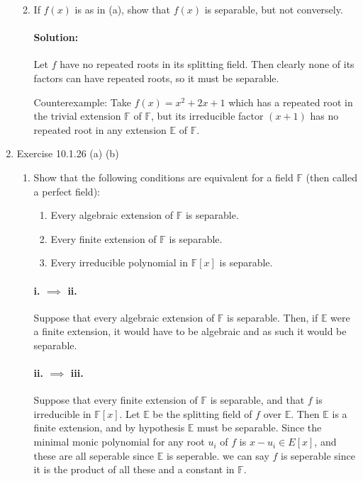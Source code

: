 \documentclass{article}
\begin{document}
\begin{enumerate}
\begin{enumerate}
\begin{enumerate}
            \end{enumerate}   
            \item If $f (x)$ is as in (a), show that $f (x)$ is separable, but not conversely.

              \paragraph{Solution:} Let $f$ have no repeated roots in its splitting field. Then clearly
              none of its factors can have repeated roots, so it must be separable.

              Counterexample: Take $f(x)=x^2+2x+1$ which has a repeated root in the trivial extension
              $\mathbb{F}$ of $\mathbb{F}$, but its irreducible factor $(x+1)$ has no repeated root in any
              extension $\mathbb{E}$ of $\mathbb{F}$. 
    \end{enumerate}
\item Exercise 10.1.26 (a) (b)
    \begin{enumerate}
        \item Show that the following conditions are equivalent for a field $\mathbb{F}$ 
            (then called a perfect field):
        \begin{enumerate}
            \item Every algebraic extension of $\mathbb{F}$ is separable.
            \item Every finite extension of $\mathbb{F}$ is separable.
            \item Every irreducible polynomial in $\mathbb{F}[x]$ is separable.
        \end{enumerate}

          \paragraph{i. $\implies$ ii. } Suppose that every algebraic extension of $\mathbb{F}$ 
          is separable. Then, if $\mathbb{E}$ were a finite extension, it would have to be
          algebraic and as such it would be separable.

          \paragraph{ii. $\implies$ iii. } Suppose that every finite extension of $\mathbb{F}$ is separable, and
          that $f$ is irreducible in $\mathbb{F}[x]$. Let $\mathbb{E}$ be the splitting field of $f$ over
          $\mathbb{E}$. Then $\mathbb{E}$ is a finite extension, and by hypothesis 
          $\mathbb{E}$ must be separable. Since the minimal monic polynomial for  any root  $u_i$ of $f$ 
          is $x-u_i\in E[x]$, and these are all seperable since $\mathbb{E}$ is seperable. we can say
          $f$ is seperable since it is the product of all these and a constant in $\mathbb{F}$. 


\end{enumerate}
\end{enumerate}
\end{document}
